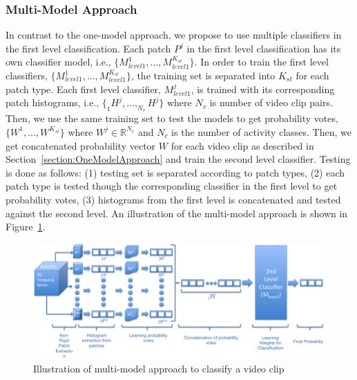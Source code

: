 \documentclass[a4paper, 10pt, conference]{ieeeconf}      %
\begin{document}
\subsubsection{Multi-Model Approach}
\label{section:MultiModelApproach}
In contrast to the one-model approach, we propose to use multiple classifiers in the first level classification. Each patch $P^{j}$ in the first level classification has its own classifier model, i.e., $\{M_{level1}^{1},\dots,M_{level1}^{K_{st}}\}$. In order to train the first level classifiers, $\{M_{level1}^{1},\dots,M_{level1}^{K_{st}}\}$, the training set is separated into $K_{st}$ for each patch type. Each first level classifier, $M_{level1}^{j}$, is trained with its corresponding patch histograms, i.e., $\{_{1}H^{j},...,_{N_{v}}H^{j}\}$ where $N_{v}$ is number of video clip pairs. Then, we use the same training set to test the models to get probability votes, $\{W^{1},...,W^{K_{st}}\}$ where $W^{j} \in \mathbb{R}^{N_{c}}$ and $N_{c}$ is the number of activity classes. Then, we get concatenated probability vector $W$ for each video clip as described in Section~\ref{section:OneModelApproach} and train the second level classifier. Testing is done as follows: (1) testing set is separated according to patch types, (2) each patch type is tested though the corresponding classifier in the first level to get probability votes, (3) histograms from the first level is concatenated and tested against the second level. An illustration of the multi-model approach is shown in Figure~\ref{fig:multiModelApproachIllustration}.
    
    
\begin{figure}[!htbp]
\begin{center}
\includegraphics[scale=0.29]{Figures/multiModelApproach3}
\end{center}
\caption{Illustration of multi-model approach to classify a video clip \label{fig:multiModelApproachIllustration}}
\end{figure}
   
\end{document}
